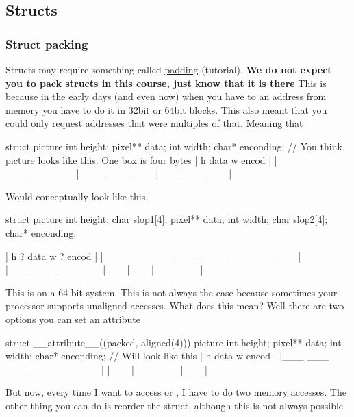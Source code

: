 \subsection{Structs}

\subsubsection{Struct packing}

Structs may require something called \href{http://www.catb.org/esr/structure-packing/}{padding} (tutorial).
\textbf{We do not expect you to pack structs in this course, just know that it
is there} This is because in the early days (and even now) when you have
to an address from memory you have to do it in 32bit or 64bit blocks.
This also meant that you could only request addresses that were
multiples of that. Meaning that

\begin{code}[language=C]
struct picture{
    int height;
    pixel** data;
    int width;
    char* enconding;
}
// You think picture looks like this. One box is four bytes
| h   data    w   encod |
|___ ___ ___ ___ ___ ___|
|___|___ ___|___|___ ___|
\end{code}

Would conceptually look like this

\begin{code}[language=C]
struct picture{
    int height;
    char slop1[4];
    pixel** data;
    int width;
    char slop2[4];
    char* enconding;
}

| h   ?   data    w   ?   encod |
|___ ___ ___ ___ ___ ___ ___ ___|
|___|___|___ ___|___|___|___ ___|
\end{code}

This is on a 64-bit system. This is not always the case because
sometimes your processor supports unaligned accesses. What does this
mean? Well there are two options you can set an attribute

\begin{code}[language=C]
struct __attribute__((packed, aligned(4))) picture{
    int height;
    pixel** data;
    int width;
    char* enconding;
}
// Will look like this
| h   data    w   encod |
|___ ___ ___ ___ ___ ___|
|___|___ ___|___|___ ___|

\end{code}

But now, every time I want to access  or ,
I have to do two memory accesses. The other thing you can do is reorder
the struct, although this is not always possible

